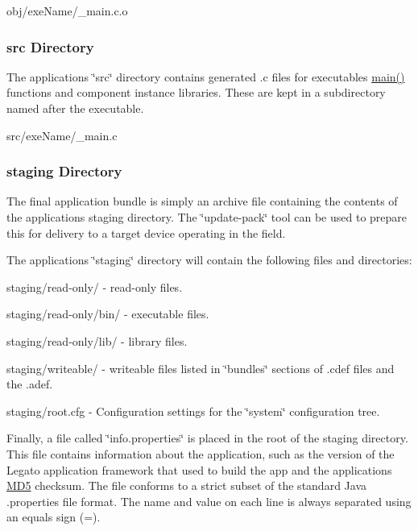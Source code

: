 \begin{DoxyItemize}
\item obj/exe\+Name/\+\_\+main.\+c.\+o
\end{DoxyItemize}\hypertarget{mkToolsDesign_mkToolsDesign_workingDirs_app_src}{}\subsubsection{src Directory}\label{mkToolsDesign_mkToolsDesign_workingDirs_app_src}
The application\textquotesingle{}s \char`\"{}src\char`\"{} directory contains generated .c files for executables\textquotesingle{} \hyperlink{start_8c_a3c04138a5bfe5d72780bb7e82a18e627}{main()} functions and component instance libraries. These are kept in a subdirectory named after the executable.


\begin{DoxyItemize}
\item src/exe\+Name/\+\_\+main.\+c
\end{DoxyItemize}\hypertarget{mkToolsDesign_mkToolsDesign_workingDirs_app_staging}{}\subsubsection{staging Directory}\label{mkToolsDesign_mkToolsDesign_workingDirs_app_staging}
The final application bundle is simply an archive file containing the contents of the application\textquotesingle{}s staging directory. The \char`\"{}update-\/pack\char`\"{} tool can be used to prepare this for delivery to a target device operating in the field.

The application\textquotesingle{}s \char`\"{}staging\char`\"{} directory will contain the following files and directories\+:


\begin{DoxyItemize}
\item staging/read-\/only/ -\/ read-\/only files.
\item staging/read-\/only/bin/ -\/ executable files.
\item staging/read-\/only/lib/ -\/ library files.
\item staging/writeable/ -\/ writeable files listed in \char`\"{}bundles\char`\"{} sections of .cdef files and the .adef.
\item staging/root.\+cfg -\/ Configuration settings for the \char`\"{}system\char`\"{} configuration tree.
\end{DoxyItemize}

Finally, a file called \char`\"{}info.\+properties\char`\"{} is placed in the root of the staging directory. This file contains information about the application, such as the version of the Legato application framework that used to build the app and the application\textquotesingle{}s \hyperlink{class_m_d5}{M\+D5} checksum. The file conforms to a strict subset of the standard Java .properties file format. The name and value on each line is always separated using an equals sign (=).


